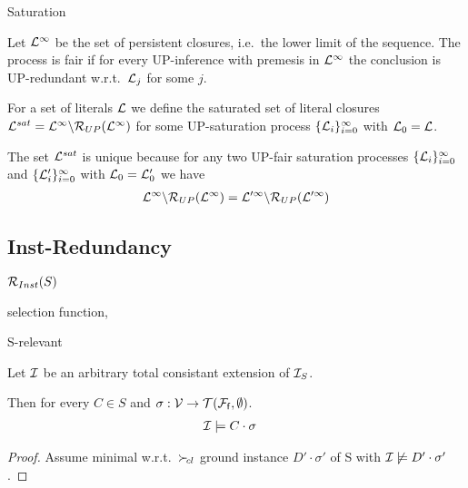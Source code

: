 \documentclass[%
handout,
]{beamer}
\begin{document}
\begin{frame}[allowframebreaks]{Saturation}
    \begin{definition}
        Let \( \mathcal{L}^\infty \) be the set of persistent closures,
        i.e.~the lower limit of the sequence.
        The process is { fair} if for every UP-inference
        with premesis in \( \mathcal{L}^\infty \) the conclusion is UP-redundant
        w.r.t.~\(\mathcal{L}_j\) for some \(j\).

        For a set of literals \( \mathcal{L} \) we define
        the saturated set of literal closures
        \( \mathcal{L}^{sat} = \mathcal{L}^\infty\backslash\mathcal{R}_{UP}(\mathcal{L}^\infty) \)
        for some UP-saturation process
        \( \{ \mathcal{L}_i\}_{i=0}^\infty \)
        with $\mathcal{L}_0 = \mathcal{L}$.
    \end{definition}

    \begin{lemma}
        The set \( \mathcal{L}^{sat} \) is unique because
        for any two UP-fair saturation processes
        \(\{ \mathcal{L}_i
            \}_{i=0}^\infty\) and
            \(\{ \mathcal{L}'_i
            \}_{i=0}^\infty\)
            with $\mathcal{L}_0 = \mathcal{L}'_0$ we have
            \begin{gather*}
                \mathcal{L}^\infty \backslash \mathcal{R}_{UP}(\mathcal{L}^\infty)
                =
                \mathcal{L}'^\infty \backslash \mathcal{R}_{UP}(\mathcal{L}'^\infty)
            \end{gather*}
    \end{lemma}
\end{frame}

\subsection{Inst-Redundancy}

\begin{frame}
    $\mathcal{R}_{Inst}(S)$

    selection function,

    S-relevant
\end{frame}

\begin{frame}
    \begin{Lemma}
        Let $\mathcal{I}$ be an arbitrary total consistant extension of $\mathcal{I}_S$.

        Then for every $C\in S$ and $\sigma:\mathcal{V}\to{\mathcal{T}(\mathcal{F}_{\mathsf{f}},\emptyset)}$.
        \begin{align*}
            \mathcal{I} &\models C\cdot\sigma
        \end{align*}
    \end{Lemma}

    \begin{proof}
        Assume minimal w.r.t.~$\mathrel\succ_{\!cl}$
        ground instance $D'\cdot\sigma'$ of S with $\mathcal{I}\not\models D'\cdot\sigma'$.
    \end{proof}
\end{frame}
\end{document}
